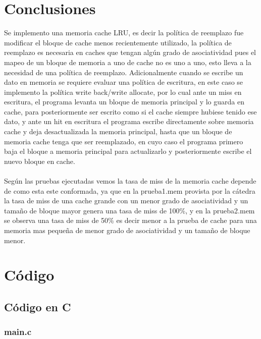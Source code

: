 \documentclass[titlepage,a4paper]{article}
\begin{document}



\section{Conclusiones}
    Se implemento una memoria cache LRU, es decir la política de reemplazo fue modificar el bloque de cache menos recientemente utilizado, la política de reemplazo es necesaria en caches que tengan algún grado de asociatividad pues el mapeo de un bloque de memoria a uno de cache no es uno a uno, esto lleva a la necesidad de una política de reemplazo. Adicionalmente cuando se escribe un dato en memoria se requiere evaluar una política de escritura, en este caso se implemento la política write back/write allocate, por lo cual ante un miss en escritura, el programa levanta un bloque de memoria principal y lo guarda en cache, para posteriormente ser escrito como si el cache siempre hubiese tenido ese dato, y ante un hit en escritura el programa escribe directamente sobre memoria cache y deja desactualizada la memoria principal, hasta que un bloque de memoria cache tenga que ser reemplazado, en cuyo caso el programa primero baja el bloque a memoria principal para actualizarlo y posteriormente escribe el nuevo bloque en cache.
    \\\\\indent Según las pruebas ejecutadas vemos la tasa de miss de la memoria cache depende de como esta este conformada, ya que en la prueba1.mem provista por la cátedra la tasa de miss de una cache grande con un menor grado de asociatividad y un tamaño de bloque mayor genera una tasa de miss de 100\%, y en la prueba2.mem se observa una tasa de miss de 50\% es decir menor a la prueba de cache para una memoria mas pequeña de menor grado de asociatividad y un tamaño de bloque menor.


\newpage
\appendix
\section{Código}
\subsection{Código en C}
\label{apendice:codigo_c}
\subsubsection{main.c}

\end{document}

